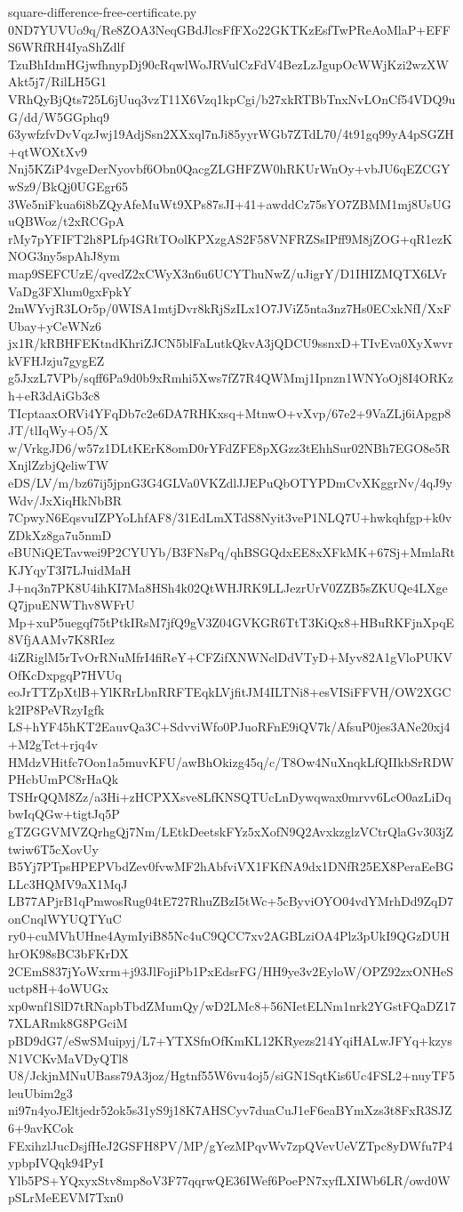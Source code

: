 \documentclass[11pt]{article}
\theoremstyle{definition}
\theoremstyle{remark}
\begin{document}
\begin{filecontents*}[overwrite]{square-difference-free-certificate.py}
0ND7YUVUo9q/Re8ZOA3NeqGBdJlcsFfFXo22GKTKzEsfTwPReAoMlaP+EFFS6WRfRH4IyaShZdlf
TzuBhIdmHGjwfhnypDj90cRqwlWoJRVulCzFdV4BezLzJgupOcWWjKzi2wzXWAkt5j7/RilLH5G1
VRhQyBjQts725L6jUuq3vzT11X6Vzq1kpCgi/b27xkRTBbTnxNvLOnCf54VDQ9uG/dd/W5GGphq9
63ywfzfvDvVqzJwj19AdjSsn2XXxql7nJi85yyrWGb7ZTdL70/4t91gq99yA4pSGZH+qtWOXtXv9
Nnj5KZiP4vgeDerNyovbf6Obn0QacgZLGHFZW0hRKUrWnOy+vbJU6qEZCGYwSz9/BkQj0UGEgr65
3We5niFkua6i8bZQyAfeMuWt9XPs87sJI+41+awddCz75sYO7ZBMM1mj8UsUGuQBWoz/t2xRCGpA
rMy7pYFIFT2h8PLfp4GRtTOolKPXzgAS2F58VNFRZSsIPff9M8jZOG+qR1ezKNOG3ny5spAhJ8ym
map9SEFCUzE/qvedZ2xCWyX3n6u6UCYThuNwZ/uJigrY/D1IHIZMQTX6LVrVaDg3FXlum0gxFpkY
2mWYvjR3LOr5p/0WISA1mtjDvr8kRjSzILx1O7JViZ5nta3nz7Hs0ECxkNfI/XxFUbay+yCeWNz6
jx1R/kRBHFEKtndKhriZJCN5blFaLutkQkvA3jQDCU9ssnxD+TIvEva0XyXwvrkVFHJzju7gygEZ
g5JxzL7VPb/sqff6Pa9d0b9xRmhi5Xws7fZ7R4QWMmj1Ipnzn1WNYoOj8I4ORKzh+eR3dAiGb3c8
TIcptaaxORVi4YFqDb7c2e6DA7RHKxsq+MtnwO+vXvp/67e2+9VaZLj6iApgp8JT/tlIqWy+O5/X
w/VrkgJD6/w57z1DLtKErK8omD0rYFdZFE8pXGzz3tEhhSur02NBh7EGO8e5RXnjlZzbjQeliwTW
eDS/LV/m/bz67ij5jpnG3G4GLVa0VKZdlJJEPuQbOTYPDmCvXKggrNv/4qJ9yWdv/JxXiqHkNbBR
7CpwyN6EqsvuIZPYoLhfAF8/31EdLmXTdS8Nyit3veP1NLQ7U+hwkqhfgp+k0vZDkXz8ga7u5nmD
eBUNiQETavwei9P2CYUYb/B3FNsPq/qhBSGQdxEE8xXFkMK+67Sj+MmlaRtKJYqyT3I7LJuidMaH
J+nq3n7PK8U4ihKI7Ma8HSh4k02QtWHJRK9LLJezrUrV0ZZB5sZKUQe4LXgeQ7jpuENWThv8WFrU
Mp+xuP5uegqf75tPtkIRsM7jfQ9gV3Z04GVKGR6TtT3KiQx8+HBuRKFjnXpqE8VfjAAMv7K8RIez
4iZRiglM5rTvOrRNuMfrI4fiReY+CFZifXNWNclDdVTyD+Myv82A1gVloPUKVOfKcDxpgqP7HVUq
eoJrTTZpXtlB+YlKRrLbnRRFTEqkLVjfitJM4ILTNi8+esVISiFFVH/OW2XGCk2IP8PeVRzyIgfk
LS+hYF45hKT2EauvQa3C+SdvviWfo0PJuoRFnE9iQV7k/AfsuP0jes3ANe20xj4+M2gTct+rjq4v
HMdzVHitfc7Oon1a5muvKFU/awBhOkizg45q/c/T8Ow4NuXnqkLfQIIkbSrRDWPHcbUmPC8rHaQk
TSHrQQM8Zz/a3Hi+zHCPXXsve8LfKNSQTUcLnDywqwax0mrvv6LcO0azLiDqbwIqQGw+tigtJq5P
gTZGGVMVZQrhgQj7Nm/LEtkDeetskFYz5xXofN9Q2AvxkzglzVCtrQlaGv303jZtwiw6T5cXovUy
B5Yj7PTpsHPEPVbdZev0fvwMF2hAbfviVX1FKfNA9dx1DNfR25EX8PeraEeBGLLc3HQMV9aX1MqJ
LB77APjrB1qPmwosRug04tE727RhuZBzI5tWc+5cByviOYO04vdYMrhDd9ZqD7onCnqlWYUQTYuC
ry0+cuMVhUHne4AymIyiB85Nc4uC9QCC7xv2AGBLziOA4Plz3pUkI9QGzDUHhrOK98sBC3bFKrDX
2CEmS837jYoWxrm+j93JlFojiPb1PxEdsrFG/HH9ye3v2EyloW/OPZ92zxONHeSuctp8H+4oWUGx
xp0wnf1SlD7tRNapbTbdZMumQy/wD2LMc8+56NIetELNm1nrk2YGstFQaDZ177XLARmk8G8PGciM
pBD9dG7/eSwSMuipyj/L7+YTXSfnOfKmKL12KRyezs214YqiHALwJFYq+kzysN1VCKvMaVDyQTl8
U8/JckjnMNuUBass79A3joz/Hgtnf55W6vu4oj5/siGN1SqtKis6Uc4FSL2+nuyTF5leuUbim2g3
ni97n4yoJEltjedr52ok5s31yS9j18K7AHSCyv7duaCuJ1eF6eaBYmXzs3t8FxR3SJZ6+9avKCok
FExihzlJucDsjfHeJ2GSFH8PV/MP/gYezMPqvWv7zpQVevUeVZTpc8yDWfu7P4ypbpIVQqk94PyI
Ylb5PS+YQxyxStv8mp8oV3F77qqrwQE36IWef6PoePN7xyfLXIWb6LR/owd0WpSLrMeEEVM7Txn0

\end{filecontents*}
\end{document}
